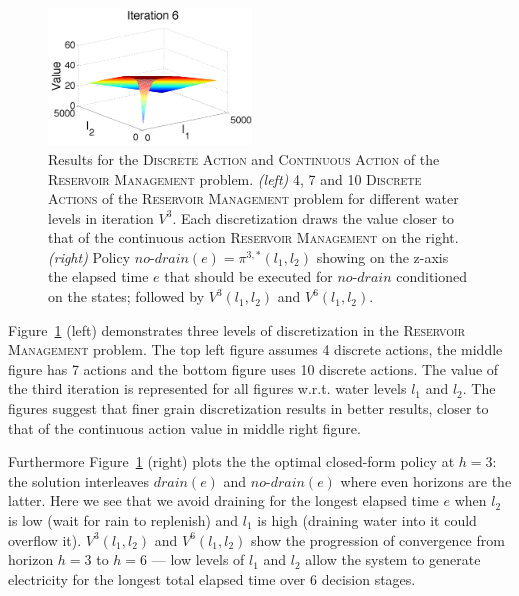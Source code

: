 \documentclass[twoside,11pt]{article}
\newcommand{\WaterReservoir}{\textsc{Reservoir Management }}
\begin{document}
\begin{figure}[tbp!]
\hspace{2mm}
\includegraphics[width=0.48\textwidth]{pics/v6.pdf}
\caption{%
Results for the \textsc{Discrete Action} and \textsc{Continuous Action} of the \WaterReservoir problem. {\it (left)} 4, 7 and 10 \textsc{Discrete Actions} of the \WaterReservoir problem for different water levels in iteration $V^3$. Each discretization draws the value closer to that of the continuous action \WaterReservoir on the right. {\it (right)} Policy $\mathit{no}$-$\mathit{drain}(e)=\pi^{3,*}(l_1,l_2)$ 
showing on the z-axis the elapsed time $e$ that should be executed 
for $\mathit{no}$-$\mathit{drain}$ conditioned on the states; followed by $V^3(l_1,l_2)$ and $V^6(l_1,l_2)$.
}
\label{fig:discreteplots}
\end{figure}
Figure~\ref{fig:discreteplots} (left) demonstrates three levels of discretization in the \WaterReservoir problem. The top left figure assumes 4 discrete actions, the middle figure has 7 actions and the bottom figure uses 10 discrete actions. The value of the third iteration is represented for all figures w.r.t. water levels $l_1$ and $l_2$. The figures suggest that finer grain discretization results in better results, closer to that of the continuous action value in middle right figure. 

Furthermore Figure~\ref{fig:discreteplots} (right) plots the  
the optimal closed-form policy at $h=3$: the solution interleaves $\mathit{drain}(e)$ and $\mathit{no}$-$\mathit{drain}(e)$ where even horizons are the latter.
Here we see that we avoid draining for the longest elapsed time $e$ 
when $l_2$ is low (wait for rain to replenish) and $l_1$ is high (draining
water into it could overflow it).  $V^3(l_1,l_2)$ and $V^6(l_1,l_2)$
show the progression of convergence from horizon $h=3$ to $h=6$ ---
low levels of $l_1$ and $l_2$ allow the system to generate electricity
for the longest total elapsed time over 6 decision stages. 
\end{document}
